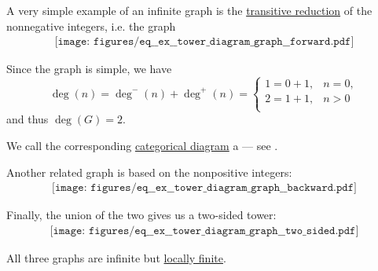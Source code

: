 \begin{example}\label{ex:tower_diagram_graph}
  A very simple example of an infinite graph is the \hyperref[def:relation_closures/transitive]{transitive reduction} of the nonnegative integers, i.e. the graph
  \begin{equation}\label{eq:ex:tower_diagram_graph/forward}
    \begin{aligned}
      \texttt{[image: figures/eq\_\_ex\_\_tower\_diagram\_graph\_\_forward.pdf]}
    \end{aligned}
  \end{equation}

  Since the graph is simple, we have
  \begin{equation*}
    \deg(n) = \deg^-(n) + \deg^+(n) = \begin{cases}
      1 = 0 + 1, &n = 0, \\
      2 = 1 + 1, &n > 0 \\
    \end{cases}
  \end{equation*}
  and thus \( \deg(G) = 2 \).

  We call the corresponding \hyperref[def:categorical_diagram]{categorical diagram} a  --- see .

  Another related graph is based on the nonpositive integers:
  \begin{equation}\label{eq:ex:tower_diagram_graph/backward}
    \begin{aligned}
      \texttt{[image: figures/eq\_\_ex\_\_tower\_diagram\_graph\_\_backward.pdf]}
    \end{aligned}
  \end{equation}

  Finally, the union of the two gives us a two-sided tower:
  \begin{equation}\label{eq:ex:tower_diagram_graph/two_sided}
    \begin{aligned}
      \texttt{[image: figures/eq\_\_ex\_\_tower\_diagram\_graph\_\_two\_sided.pdf]}
    \end{aligned}
  \end{equation}

  All three graphs are infinite but \hyperref[def:graph_incidence/locally_finite]{locally finite}.
\end{example}

